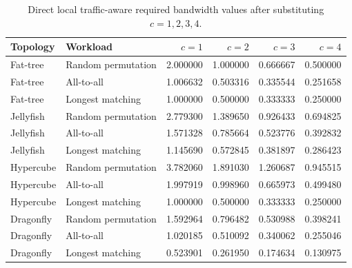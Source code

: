 \documentclass[conference]{IEEEtran}
\begin{document}
\begin{table}[!t]
\centering
\caption{Direct local traffic-aware required bandwidth values after substituting \(c=1,2,3,4\).}
\small
\begin{tabular}{llrrrr}
\toprule
Topology & Workload & \(c=1\) & \(c=2\) & \(c=3\) & \(c=4\) \\
\midrule
Fat-tree & Random permutation & 2.000000 & 1.000000 & 0.666667 & 0.500000 \\
Fat-tree & All-to-all & 1.006632 & 0.503316 & 0.335544 & 0.251658 \\
Fat-tree & Longest matching & 1.000000 & 0.500000 & 0.333333 & 0.250000 \\
Jellyfish & Random permutation & 2.779300 & 1.389650 & 0.926433 & 0.694825 \\
Jellyfish & All-to-all & 1.571328 & 0.785664 & 0.523776 & 0.392832 \\
Jellyfish & Longest matching & 1.145690 & 0.572845 & 0.381897 & 0.286423 \\
Hypercube & Random permutation & 3.782060 & 1.891030 & 1.260687 & 0.945515 \\
Hypercube & All-to-all & 1.997919 & 0.998960 & 0.665973 & 0.499480 \\
Hypercube & Longest matching & 1.000000 & 0.500000 & 0.333333 & 0.250000 \\
Dragonfly & Random permutation & 1.592964 & 0.796482 & 0.530988 & 0.398241 \\
Dragonfly & All-to-all & 1.020185 & 0.510092 & 0.340062 & 0.255046 \\
Dragonfly & Longest matching & 0.523901 & 0.261950 & 0.174634 & 0.130975 \\
\bottomrule
\end{tabular}
\end{table}

\clearpage
\end{document}
